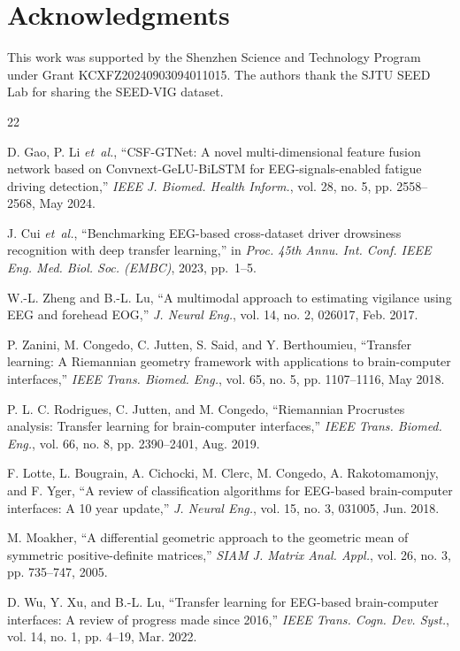 \documentclass[journal,twoside,web]{ieeecolor2}
\begin{document}
\section*{Acknowledgments}
This work was supported by the Shenzhen Science and Technology
Program under Grant KCXFZ20240903094011015. The authors thank the
SJTU SEED Lab for sharing the SEED-VIG dataset.

\begin{thebibliography}{22}

D. Gao, P. Li \emph{et~al.}, ``CSF-GTNet: A novel multi-dimensional
feature fusion network based on Convnext-GeLU-BiLSTM for
EEG-signals-enabled fatigue driving detection,'' \emph{IEEE J.
Biomed. Health Inform.}, vol. 28, no. 5, pp. 2558--2568, May 2024.

J. Cui \emph{et~al.}, ``Benchmarking EEG-based cross-dataset driver
drowsiness recognition with deep transfer learning,'' in \emph{Proc.
45th Annu. Int. Conf. IEEE Eng. Med. Biol. Soc. (EMBC)}, 2023,
pp.~1--5.

W.-L. Zheng and B.-L. Lu, ``A multimodal approach to estimating
vigilance using EEG and forehead EOG,'' \emph{J. Neural Eng.},
vol. 14, no. 2, 026017, Feb. 2017.

P. Zanini, M. Congedo, C. Jutten, S. Said, and Y. Berthoumieu,
``Transfer learning: A Riemannian geometry framework with
applications to brain-computer interfaces,'' \emph{IEEE Trans.
Biomed. Eng.}, vol. 65, no. 5, pp. 1107--1116, May 2018.

P. L. C. Rodrigues, C. Jutten, and M. Congedo, ``Riemannian
Procrustes analysis: Transfer learning for brain-computer
interfaces,'' \emph{IEEE Trans. Biomed. Eng.}, vol. 66, no. 8,
pp. 2390--2401, Aug. 2019.

F. Lotte, L. Bougrain, A. Cichocki, M. Clerc, M. Congedo,
A. Rakotomamonjy, and F. Yger, ``A review of classification
algorithms for EEG-based brain-computer interfaces: A 10 year
update,'' \emph{J. Neural Eng.}, vol. 15, no. 3, 031005,
Jun. 2018.

M. Moakher, ``A differential geometric approach to the geometric
mean of symmetric positive-definite matrices,'' \emph{SIAM J. Matrix
Anal. Appl.}, vol. 26, no. 3, pp. 735--747, 2005.

D. Wu, Y. Xu, and B.-L. Lu, ``Transfer learning for EEG-based
brain-computer interfaces: A review of progress made since 2016,''
\emph{IEEE Trans. Cogn. Dev. Syst.}, vol. 14, no. 1, pp. 4--19,
Mar. 2022.


\end{thebibliography}
\end{document}
